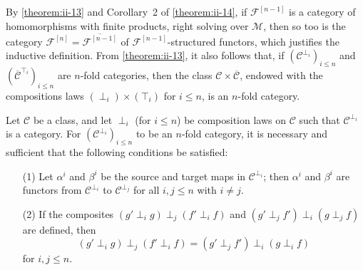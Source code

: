 \documentclass[a4paper,fleqn]{article}
\theoremstyle{plain}
\newenvironment{theorem}[1]
  {\renewcommand\theinnertheorem{#1}\innertheorem}
  {\endinnertheorem}
\theoremstyle{definition}
\renewcommand{\leq}{\leqslant}
\newcommand{\CC}{\mathcal{C}}
\newcommand{\MM}{\mathcal{M}}
\newcommand{\FF}{\mathcal{F}}
\begin{document}
By \cref{theorem:ii-13} and Corollary~2 of \cref{theorem:ii-14}, if $\FF^{[n-1]}$ is a category of homomorphisms with finite products, right solving over $\MM$, then so too is the category $\FF^{[n]}=\overline{\FF^{[n-1]}}$ of $\FF^{[n-1]}$-structured functors, which justifies the inductive definition.
From \cref{theorem:ii-13}, it also follows that, if $(\CC^{\perp_i})_{i\leq n}$ and $(\overline{\CC}^{\top_i})_{i\leq n}$ are $n$-fold categories, then the class $\CC\times\overline{\CC}$, endowed with the compositions laws $(\perp_i)\times(\top_i)$ for $i\leq n$, is an $n$-fold category.

\begin{theorem}{8}
\label{theorem:ii-8}
  Let $\CC$ be a class, and let $\perp_i$ (for $i\leq n$) be composition laws on $\CC$ such that $\CC^{\perp_i}$ is a category.
  For $(\CC^{\perp_i})_{i\leq n}$ to be an $n$-fold category, it is necessary and sufficient that the following conditions be satisfied:
  \begin{enumerate}
    \item[\normalfont(1)]
      Let $\alpha^i$ and $\beta^i$ be the source and target maps in $\CC^{\perp_i}$;
      then $\alpha^i$ and $\beta^i$ are functors from $\CC^{\perp_i}$ to $\CC^{\perp_j}$ for all $i,j\leq n$ with $i\neq j$.

    \item[\normalfont(2)]
      If the composites $(g'\perp_i g)\perp_j(f'\perp_i f)$ and $(g'\perp_j f')\perp_i(g\perp_j f)$ are defined, then
      \[
        (g'\perp_i g)\perp_j(f'\perp_i f)
        = (g'\perp_j f')\perp_i(g\perp_i f)
      \]
      for $i,j\leq n$.
  \end{enumerate}
\end{theorem}
\end{document}
